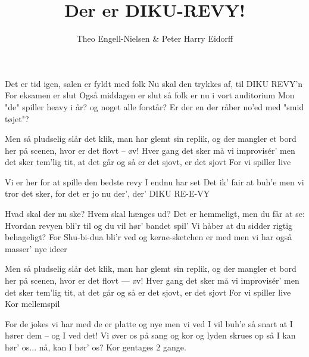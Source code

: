 \documentclass[10pt]{article}
\title{Der er DIKU-REVY!}
\author{Theo Engell-Nielsen \& Peter Harry Eidorff}
\begin{document}
\maketitle

\begin{song}
Det er tid igen, salen er fyldt med folk
Nu skal den trykkes af, til DIKU REVY'n
For eksamen er slut
Også middagen er slut
så folk er nu i vort auditorium
Mon "de" spiller heavy i år?
og noget alle forstår?
Er der en der råber no'ed med "smid tøjet"?

Men så pludselig slår det klik, man har glemt sin replik,
og der mangler et bord her på scenen, hvor er det flovt -- øv!
Hver gang det sker må vi improvis\'er' 
men det sker tem'lig tit, at det går 
og så er det sjovt, er det sjovt
For vi spiller live

%
Vi er her for at spille
den bedste revy I endnu har set 
Det ik' fair at buh'e
men vi tror det sker, for det er jo nu
der', der' DIKU RE-E-VY

%
Hvad skal der nu ske? Hvem skal hænges ud?
Det er hemmeligt, men du får at se:
Hvordan revyen bli'r til
og du vil hør' bandet spil'
Vi håber at du sidder rigtig behageligt?
For Shu-bi-dua bli'r ved
og kerne-sketchen er med
men vi har også masser' nye ideer

Men så pludselig slår det klik, man har glemt sin replik,
og der mangler et bord her på scenen, hvor er det flovt --- øv!
Hver gang det sker må vi improvis\'er' 
men det sker tem'lig tit, at det går 
og så er det sjovt, er det sjovt
For vi spiller live
\scene Kor
\scene mellemspil

%
For de jokes vi har med de er platte og nye
men vi ved I vil buh'e 
så snart at I hører dem -- og I ved det!
Vi øver os på sang og kor og lyden skrues op
så I kan hør' os... nå, kan I hør' os?
\scene Kor gentages 2 gange.


\end{song}
\end{document}
